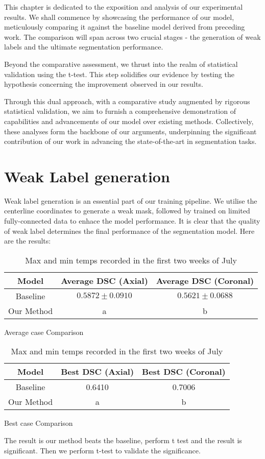 This chapter is dedicated to the exposition and analysis of our experimental results. We shall commence by showcasing the performance of our model, meticulously comparing it against the baseline model derived from preceding work. The comparison will span across two crucial stages - the generation of weak labels and the ultimate segmentation performance.

Beyond the comparative assessment, we thrust into the realm of statistical validation using the t-test. This step solidifies our evidence by testing the hypothesis concerning the improvement observed in our results.

Through this dual approach, with a comparative study augmented by rigorous statistical validation, we aim to furnish a comprehensive demonstration of capabilities and advancements of our model over existing methods. Collectively, these analyses form the backbone of our arguments, underpinning the significant contribution of our work in advancing the state-of-the-art in segmentation tasks.

\section{Weak Label generation}

Weak label generation is an essential part of our training pipeline. We utilise the centerline coordinates to generate a weak mask, followed by trained on limited fully-connected data to enhace the model performance. It is clear that the quality of weak label determines the final performance of the segmentation model. Here are the results:

\begin{table}[h]
    \begin{subtable}[b]{\textwidth}
        \centering
        \begin{tabular}{c | c | c}
        Model & Average DSC (Axial) & Average DSC (Coronal) \\
        \hline
        Baseline & \(0.5872 \pm 0.0910\)  & \(0.5621 \pm 0.0688\)\\
        \hline
        Our Method & a & b 
       \end{tabular}
       \caption{Average case Comparison}
       \label{tab:week1}
    \end{subtable}
    \vfill
    \begin{subtable}[b]{\textwidth}
        \centering
        \begin{tabular}{c | c | c}
        Model & Best DSC (Axial) & Best DSC (Coronal) \\
        \hline
        Baseline & 0.6410 & 0.7006\\
        \hline
        Our Method & a & b 
       \end{tabular}
       \caption{Best case Comparison}
       \label{tab:week2}
    \end{subtable}
     \caption{Max and min temps recorded in the first two weeks of July}
     \label{tab:temps}
\end{table}
The result is our method beats the baseline, perform t test and the result is significant. Then we perform t-test to validate the significance.

